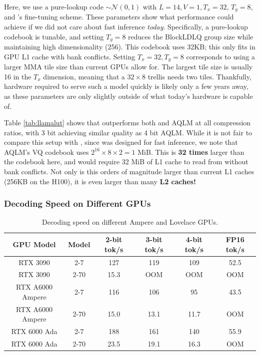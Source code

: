 Here, we use a pure-lookup code $\sim \mathcal{N}(0, 1)$ with $L = 14, V = 1, T_x = 32$, $T_y = 8$, and \qs's fine-tuning scheme.
These parameters show what performance \qts could achieve if we did not care about fast inference \textit{today}. 
Specifically, a pure-lookup codebook is tunable, and setting $T_y = 8$ reduces the BlockLDLQ group size while maintaining high dimensionality (256).
This codebook uses 32KB; this only fits in GPU L1 cache with bank conflicts.
Setting $T_x=32, T_y=8$ corresponds to using a larger MMA tile size than current GPUs allow for. 
The largest tile size is usually 16 in the $T_x$ dimension, meaning that a $32\times 8$ trellis needs two tiles.
Thankfully, hardware required to serve such a model quickly is likely only a few years away, as these parameters are only slightly outside of what today's hardware is capable of.

Table \ref{tab:llamalut} shows that \qts outperforms both \qss and AQLM at all compression ratios, with 3 bit \qts achieving similar quality as 4 bit AQLM.
While it is not fair to compare this \qts setup with \qs, since \qss was designed for fast inference, we note that AQLM's VQ codebook uses $2^{16} \times 8 \times 2 = 1$ MiB. 
This is \textbf{32 times} larger than the \qts codebook here, and would require 32 MiB of L1 cache to read from without bank conflicts.
Not only is this orders of magnitude larger than current L1 caches (256KB on the H100), it is even larger than many \textbf{L2 caches!}

\subsubsection{Decoding Speed on Different GPUs}

\begin{table}[h]
\centering
\caption{Decoding speed on different Ampere and Lovelace GPUs.}
\begin{tabular}{@{}cccccc@{}}
\toprule
GPU Model        & Model & 2-bit tok/s & 3-bit tok/s & 4-bit tok/s & FP16 tok/s \\ \midrule
RTX 3090         & 2-7  & 127         & 119         & 109         & 52.5       \\
RTX 3090         & 2-70 & 15.3        & OOM         & OOM         & OOM        \\
RTX A6000 Ampere & 2-7  & 116         & 106         & 95          & 43.5       \\
RTX A6000 Ampere & 2-70 & 15.0        & 13.1        & 11.7        & OOM        \\
RTX 6000 Ada     & 2-7  & 188         & 161         & 140         & 55.9       \\
RTX 6000 Ada     & 2-70 & 23.5        & 19.1        & 16.3        & OOM        \\ \bottomrule
\end{tabular}
\end{table}

